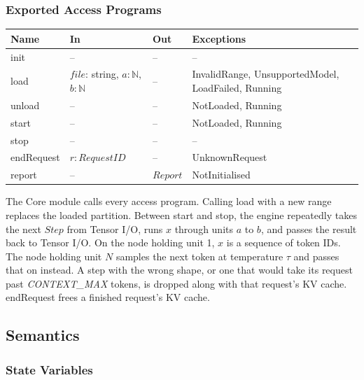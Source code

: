 \documentclass[12pt, titlepage]{article}
\begin{document}
\subsubsection{Exported Access Programs}

\begin{center}
\begin{tabular}{p{2.6cm} p{4.6cm} p{2.0cm} p{4.4cm}}
\toprule
\textbf{Name} & \textbf{In} & \textbf{Out} & \textbf{Exceptions} \\
\midrule
init & -- & -- & -- \\
load & $\mathit{file}$: string, $a: \mathbb{N}$, $b: \mathbb{N}$ & -- &
  InvalidRange, UnsupportedModel, LoadFailed, Running \\
unload & -- & -- & NotLoaded, Running \\
start & -- & -- & NotLoaded, Running \\
stop & -- & -- & -- \\
endRequest & $r: \mathit{RequestID}$ & -- & UnknownRequest \\
report & -- & $\mathit{Report}$ & NotInitialised \\
\bottomrule
\end{tabular}
\end{center}

{\raggedright \noindent The Core module calls every access program. Calling
load with a new range replaces the loaded partition. Between start and stop,
the engine repeatedly takes the next $\mathit{Step}$ from Tensor I/O, runs $x$
through units $a$ to $b$, and passes the result back to Tensor I/O. On the node
holding unit 1, $x$ is a sequence of token IDs. The node holding unit $N$
samples the next token at temperature $\tau$ and passes that on instead. A step
with the wrong shape, or one that would take its request past
\textit{CONTEXT\_MAX} tokens, is dropped along with that request's KV cache.
endRequest frees a finished request's KV cache.\par}

\subsection{Semantics}

\subsubsection{State Variables}
\end{document}
